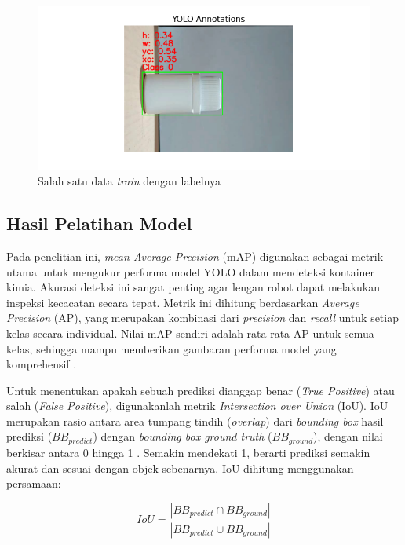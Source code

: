 \begin{figure}[H]
  \centering
  \includegraphics[width=1\textwidth]{gambar/anotasi.png}
  \caption{Salah satu data \textit{train} dengan labelnya}
  \label{fig:yolo-anotasi}
\end{figure}
\vspace{-1em}

\vspace{1em}

\subsection{Hasil Pelatihan Model}
Pada penelitian ini, \textit{mean Average Precision} (mAP) digunakan sebagai
metrik utama untuk mengukur performa model YOLO dalam mendeteksi
kontainer kimia. Akurasi deteksi ini sangat penting agar lengan robot
dapat melakukan inspeksi kecacatan secara tepat. Metrik ini dihitung
berdasarkan \textit{Average Precision} (AP), yang merupakan kombinasi dari
\textit{precision} dan \textit{recall} untuk setiap kelas secara
individual. Nilai mAP
sendiri adalah rata-rata AP untuk semua kelas, sehingga mampu
memberikan gambaran performa model yang komprehensif \citep{21}. \par

Untuk menentukan apakah sebuah prediksi dianggap benar (\textit{True
Positive}) atau salah (\textit{False Positive}), digunakanlah metrik
\textit{Intersection over Union} (IoU). IoU merupakan rasio antara area
tumpang tindih (\textit{overlap}) dari \textit{bounding box} hasil prediksi
($BB_{predict}$) dengan
\textit{bounding box ground truth} ($BB_{ground}$), dengan nilai berkisar antara
0 hingga 1 \citep{22}.
Semakin mendekati 1, berarti prediksi semakin akurat dan sesuai
dengan objek sebenarnya. IoU dihitung menggunakan persamaan:

\begin{equation}
  IoU = \frac{|BB_{predict} \cap
  BB_{ground}|}{|BB_{predict} \cup BB_{ground}|}
\end{equation}

